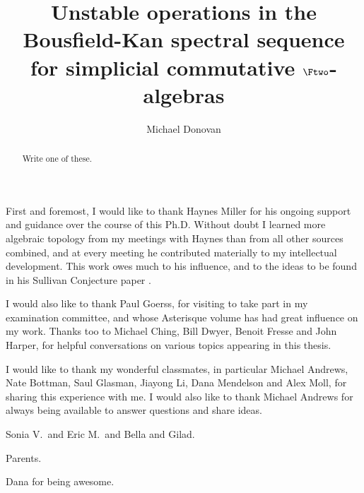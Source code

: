 \documentclass[11pt]{amsart} \renewcommand{\baselinestretch}{1.2}
\title[The Bousfield-Kan spectral sequence for simplicial algebras]{Unstable operations in the Bousfield-Kan spectral sequence for simplicial commutative $\Ftwo$-algebras}
\author[M.\ Donovan]{Michael Donovan}
\theoremstyle{plain}
\numberwithin{equation}{section} %
\theoremstyle{plain}
\numberwithin{equation}{chapter} %
\begin{document}
\begin{Contents Page}
\begin{abstract}
Write one of these.
\end{abstract}
\maketitle
\tableofcontents
\end{Contents Page}




\begin{ThankS}

First and foremost, I would like to thank Haynes Miller for his ongoing support and guidance over the course of this Ph.D. Without doubt I learned more algebraic topology from my meetings with Haynes than from all other sources combined, and at every meeting he contributed materially to my intellectual development. This work owes much to his influence, and to the ideas to be found in his Sullivan Conjecture paper \cite{MillerSullivanConjecture.pdf}.

I would also like to thank Paul Goerss, for visiting to take part in my examination committee, and whose Asterisque volume \cite{MR1089001} has had great influence on my work.
Thanks too to Michael Ching, Bill Dwyer, Benoit Fresse and John Harper, for helpful conversations on various topics appearing in this thesis.

I would like to thank my wonderful classmates, in particular Michael Andrews, Nate Bottman, Saul Glasman, Jiayong Li, Dana Mendelson and Alex Moll, for sharing this experience with me. I would also like to thank Michael Andrews for always being available to answer questions and share ideas.




Sonia V.\ and Eric M.\ and Bella and Gilad.

Parents.

Dana for being awesome.

\end{ThankS}




\end{document}
